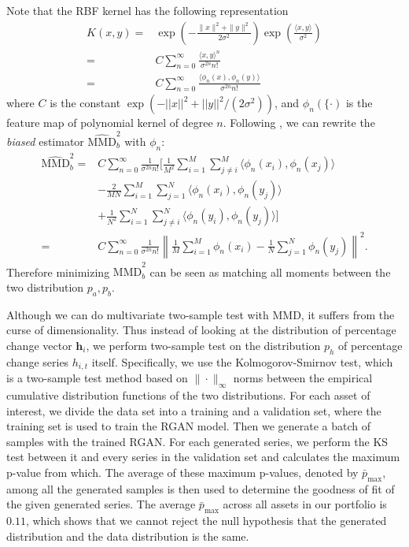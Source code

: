 \documentclass{article}
\begin{document}
Note that the RBF kernel has the following representation
\begin{equation*}
    \begin{aligned}
    K(x,y)=&\exp\left(-\frac{\|x\|^2+\|y\|^2}{2\sigma^2}\right) \exp\left(\frac{\langle x,y \rangle}{\sigma^2}\right) \\
    =&C \sum^\infty_{n=0}\frac{\langle x,y \rangle^n}{\sigma^{2n} n!}\\
    =&C \sum^\infty_{n=0}\frac{\langle\phi_n(x),\phi_n(y)\rangle }{\sigma^{2n} n!}
    \end{aligned}
\end{equation*}
where $C$ is the constant $\exp\left(-||x||^2+||y||^2/(2\sigma^2)\right)$, and $\phi_n(\{\cdot)$ is the feature map of polynomial kernel of degree $n$. Following \cite{yujia2015gmmn}, we can rewrite the \textit{biased} estimator $\widehat{\text{MMD}}^2_b$ with $\phi_n$:
\begin{equation*}
    \begin{aligned}
        \widehat{\text{MMD}}^2_b=& C\sum^\infty_{n=0} \frac{1}{\sigma^{2n} n!} \biggl[ \frac{1}{M^2}\sum_{i=1}^M\sum_{j\neq i}^M \langle\phi_n(x_i),\phi_n(x_j)\rangle \\
        &-\frac{2}{MN}\sum_{i=1}^M\sum_{j=1}^N \langle\phi_n(x_i),\phi_n(y_j)\rangle \\
        &+\frac{1}{ N^2 }\sum_{i=1}^N\sum_{j\neq i}^N \langle\phi_n(y_i),\phi_n(y_j)\rangle \biggr] \\
        =& C\sum^\infty_{n=0} \frac{1}{\sigma^{2n} n!} \left\| \frac{1}{M}\sum^M_{i=1}\phi_n(x_i) - \frac{1}{N}\sum^N_{j=1}\phi_n(y_j) \right\|^2.
    \end{aligned}
\end{equation*}
Therefore minimizing $\widehat{\text{MMD}}^2_b$ can be seen as matching all moments between the two distribution $p_a, p_b$.

Although we can do multivariate two-sample test with MMD, it suffers from the curse of dimensionality. Thus instead of looking at the distribution of percentage change vector $\mathbf{h}_i$, we perform two-sample test on the distribution $p_h$ of percentage change series $h_{i,t}$ itself. Specifically, we use the Kolmogorov-Smirnov test, which is a two-sample test method based on $\|\cdot\|_\infty$ norms between the empirical cumulative distribution functions of the two distributions. For each asset of interest, we divide the data set into a training and a validation set, where the training set is used to train the RGAN model. Then we generate a batch of samples with the trained RGAN. For each generated series, we perform the KS test between it and every series in the validation set and calculates the maximum p-value from which. The average of these maximum p-values, denoted by $\bar{p}_{\max}$, among all the generated samples is then used to determine the goodness of fit of the given generated series. The average $\bar{p}_{\max}$ across all assets in our portfolio is $0.11$, which shows that we cannot reject the null hypothesis that the generated distribution and the data distribution is the same.
\end{document}
